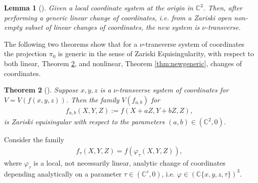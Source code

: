 \documentclass[11pt,a4paper]{amsart}
\newcommand{\1}{{1\!\!1}}
\numberwithin{equation}{section}
\theoremstyle{plain}%
\newtheorem{thm}{Theorem}[section]
\newtheorem{lemma}[thm]{Lemma}
\theoremstyle{definition}
\theoremstyle{definition}
\theoremstyle{remark}
\newcommand{\C}{\mathbb{C}}
\newcommand{\kk}{{k}}
\renewcommand{\1}{\mathbf{1}}
\newcommand{\impli}{\varphi}
\newcommand{\snt}{$\nu$-transverse}
\newcommand{\unt}{$\nu$-transverse }
\begin{document}
\begin{lemma}[{\cite[Lemma 4.2]{PP24}}]\label{lem:newgenericlinear==>nu}
Given a local coordinate system  at the origin in $\C^3$.  Then, after performing a generic linear change of coordinates, i.e.  from a Zariski open non-empty subset of linear changes of coordinates, the new system is \snt.  
\end{lemma}



The following two theorems show that for a \unt system of coordinates the projection $\pi_0$ is generic in the sense of Zariski Equisingularity,  with respect to both linear, Theorem \ref{thm:newgenlin},  and nonlinear, Theorem \ref{thm:newgeneric}, changes of coordinates. 

\begin{thm}[{\cite[Theorem 4.4]{PP24}}]\label{thm:newgenlin}
Suppose $x,y,z$ is a \unt system of coordinates for $V= V(f(x,y,z))$. 
 Then the family $V(f_{a,b})$ for 
\begin{align}\label{eq:newlinearfamily}
f_{a,b}(X,Y,Z):= f(X+aZ,Y+bZ,Z), 
\end{align}
is Zariski equisingular with respect to the parameters $(a,b)\in (\C^2,0)$. 
\end{thm}
 

Consider the  family 
\begin{align} \label{eq:newgenericfamily}
f_\tau (X, Y, Z)= f(\impli_\tau  (X,Y,Z)) ,
\end{align}
where $\impli_\tau $ is a local, not necessarily linear, analytic change of coordinates depending analytically on a parameter $\tau\in (\C^s,0)$, 
i.e. $\impli \in (\C\{ x,y,z,\tau\}) ^3$.  
\end{document}
